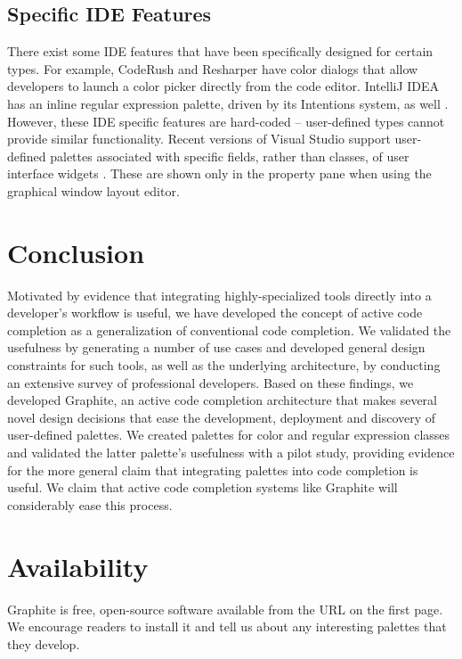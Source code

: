 \documentclass[10pt, conference, compsocconf]{IEEEtran}
\begin{document}
\subsection{Specific IDE Features}
There exist some IDE features that have been specifically designed for certain types. For example, CodeRush \cite{CodeRush} and Resharper \cite{Resharper} have color dialogs that allow developers to launch a color picker directly from the code editor. IntelliJ IDEA has an inline regular expression palette, driven by its Intentions system, as well \cite{IntelliJRegexp}. However, these IDE specific features are hard-coded -- user-defined types cannot provide similar functionality. Recent versions of Visual Studio support user-defined palettes associated with specific fields, rather than classes, of user interface widgets \cite{VSWidgets}. These are shown only in the property pane when using the graphical window layout editor.

\section{Conclusion}
Motivated by evidence that integrating highly-specialized tools directly into a developer's workflow is useful, we have developed the concept of active code completion as a generalization of conventional code completion. We validated the usefulness by generating a number of use cases and developed general design constraints for such tools, as well as the underlying architecture, by conducting an extensive survey of professional developers. Based on these findings, we developed Graphite, an active code completion architecture that makes several novel design decisions that ease the development, deployment and discovery of user-defined palettes. We created palettes for color and regular expression classes and validated the latter palette's usefulness with a pilot study, providing evidence for the more general claim that integrating palettes into code completion is useful. We claim that active code completion systems like Graphite will considerably ease this process.

\section{Availability}
Graphite is free, open-source software available from the URL on the first page. We encourage readers to install it and tell us about any interesting palettes that they develop.

\end{document}

